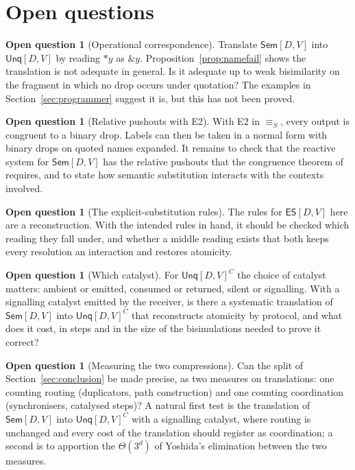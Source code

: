 \documentclass[11pt,a4paper]{article}
\theoremstyle{plain}
\theoremstyle{definition}
\newtheorem{question}[theorem]{Open question}
\theoremstyle{remark}
\newcommand{\drop}[1]{{*}#1}
\newcommand{\unq}[1]{\mathop{\&}#1}
\newcommand{\scong}{\equiv_{S}}
\newcommand{\Sem}{\textsf{Sem}[D,V]}
\newcommand{\Unq}{\textsf{Unq}[D,V]}
\newcommand{\ES}{\textsf{ES}[D,V]}
\begin{document}
\section{Open questions}\label{sec:open}

\begin{question}[Operational correspondence]
Translate $\Sem$ into $\Unq$ by reading $\drop{y}$ as $\unq{y}$.
Proposition~\ref{prop:namefail} shows the translation is not adequate in
general. Is it adequate up to weak bisimilarity on the fragment in which no
drop occurs under quotation? The examples in Section~\ref{sec:programmer}
suggest it is, but this has not been proved.
\end{question}

\begin{question}[Relative pushouts with E2]
With E2 in $\scong$, every output is congruent to a binary drop. Labels can
then be taken in a normal form with binary drops on quoted names expanded.
It remains to check that the reactive system for $\Sem$ has the relative
pushouts that the congruence theorem of \cite{LM00} requires, and to state
how semantic substitution interacts with the contexts involved.
\end{question}

\begin{question}[The explicit-substitution rules]
The rules for $\ES$ here are a reconstruction. With the intended rules in
hand, it should be checked which reading they fall under, and whether a
middle reading exists that both keeps every resolution an interaction and
restores atomicity.
\end{question}

\begin{question}[Which catalyst]
For $\Unq^{C}$ the choice of catalyst matters: ambient or emitted, consumed or
returned, silent or signalling. With a signalling catalyst emitted by the
receiver, is there a systematic translation of $\Sem$ into $\Unq^{C}$ that
reconstructs atomicity by protocol, and what does it cost, in steps and in the
size of the bisimulations needed to prove it correct?
\end{question}

\begin{question}[Measuring the two compressions]
Can the split of Section~\ref{sec:conclusion} be made precise, as two
measures on translations: one counting routing (duplicators, path
construction) and one counting coordination (synchronisers, catalysed
steps)? A natural first test is the translation of $\Sem$ into $\Unq^{C}$
with a signalling catalyst, where routing is unchanged and every cost of the
translation should register as coordination; a second is to apportion the
$\Theta(3^{d})$ of Yoshida's elimination between the two measures.
\end{question}
\end{document}
